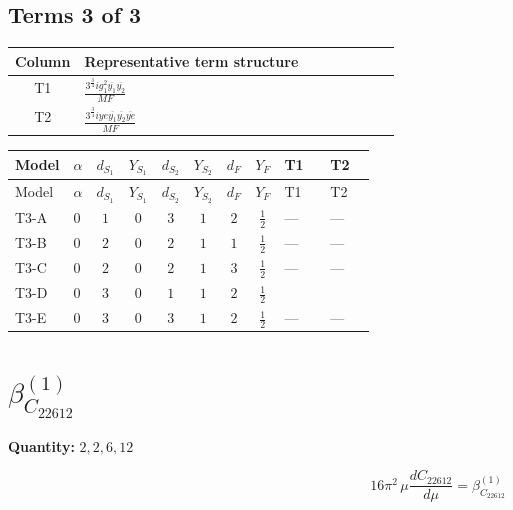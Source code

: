 \documentclass[8pt]{article}
\begin{document}
\begin{landscape}
\subsection*{Terms 3 of 3}
\begin{center}
\begin{tabular}{@{}c >{\raggedright\arraybackslash}p{0.82\linewidth}@{}}
\toprule
Column & Representative term structure \\
\midrule
T1 & \(\displaystyle \frac{3^{\frac{3}{4}} i g_{1}^{2} \overline{y_{1}} \overline{y_{2}}}{MF}\) \\
\midrule
T2 & \(\displaystyle \frac{3^{\frac{3}{4}} i ye \overline{y_{1}} \overline{y_{2}} \overline{ye}}{MF}\) \\
\midrule
\bottomrule
\end{tabular}
\end{center}
\smallskip
\tiny
\begin{longtable}{@{}llcccccc >{\raggedright\arraybackslash}p{0.21\linewidth} >{\raggedright\arraybackslash}p{0.21\linewidth}@{}}
\toprule
Model & $\alpha$ & $d_{S_1}$ & $Y_{S_1}$ & $d_{S_2}$ & $Y_{S_2}$ & $d_F$ & $Y_F$ & T1 & T2 \\
\midrule
\endfirsthead
\toprule
Model & $\alpha$ & $d_{S_1}$ & $Y_{S_1}$ & $d_{S_2}$ & $Y_{S_2}$ & $d_F$ & $Y_F$ & T1 & T2 \\
\midrule
\endhead
T3-A & $0$ & $1$ & $0$ & $3$ & $1$ & $2$ & $\frac{1}{2}$ & --- & --- \\
\midrule
T3-B & $0$ & $2$ & $0$ & $2$ & $1$ & $1$ & $\frac{1}{2}$ & --- & --- \\
\midrule
T3-C & $0$ & $2$ & $0$ & $2$ & $1$ & $3$ & $\frac{1}{2}$ & --- & --- \\
\midrule
T3-D & $0$ & $3$ & $0$ & $1$ & $1$ & $2$ & $\frac{1}{2}$ & \scriptsize\adjustbox{max width=\linewidth}{$\begin{gathered} - \frac{3^{\frac{3}{4}} i g_{1}^{2} \overline{y_{1}} \overline{y_{2}}}{8 MF}\end{gathered}$} & \scriptsize\adjustbox{max width=\linewidth}{$\begin{gathered} \frac{3^{\frac{3}{4}} i ye \overline{y_{1}} \overline{y_{2}} \overline{ye}}{12 MF}\end{gathered}$} \\
\midrule
T3-E & $0$ & $3$ & $0$ & $3$ & $1$ & $2$ & $\frac{1}{2}$ & --- & --- \\
\midrule
\bottomrule
\end{longtable}
\clearpage
\section*{$\beta_{C_{22612}}^{(1)}$}
\noindent\textbf{Quantity: }$\mathrm{2,2,6,12}$\par\smallskip
\[16\pi^2\,\mu\frac{d C_{22612}}{d\mu}=\beta_{C_{22612}}^{(1)}\]

\end{landscape}
\end{document}

